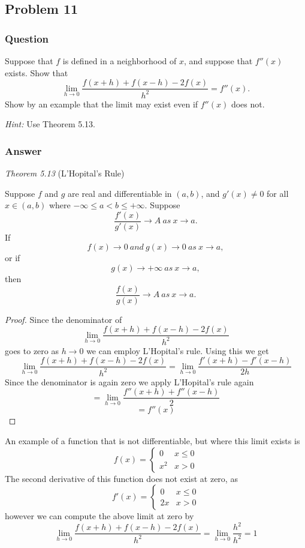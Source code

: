 \documentclass[12pt]{article}
\begin{document}
\subsection{Problem 11}

\subsubsection{Question}
Suppose that $f$ is defined in a neighborhood of $x$, and suppose that $f''(x)$ exists. Show that
\[\lim_{h \to 0}\frac{f(x+h)+f(x-h)-2 f(x)}{h^2} = f''(x).\]
Show by an example that the limit may exist even if $f''(x)$ does not.

\emph{Hint:} Use Theorem 5.13.

\subsubsection{Answer}

\emph{Theorem 5.13} (L'Hopital's Rule)

Suppose $f$ and $g$ are real and differentiable in $(a,b)$, and $g'(x) \neq 0$ for all $x\in (a,b)$ where $-\infty \leq a < b \leq + \infty$. Suppose
\[\frac{f'(x)}{g'(x)} \to A\ as\ x \to a.\]
If
\[f(x)\to 0\ and\ g(x)\to 0\ as\ x\to a,\]
or if
\[g(x)\to +\infty\ as\ x\to a,\]
then
\[\frac{f(x)}{g(x)}\to A\ as\ x\to a.\]

\begin{proof}
Since the denominator of 
\[\lim_{h \to 0}\frac{f(x+h)+f(x-h)-2 f(x)}{h^2}\]
goes to zero as $h \to 0$ we can employ L'Hopital's rule. Using this we get  
\[\lim_{h \to 0}\frac{f(x+h)+f(x-h)-2 f(x)}{h^2} = \lim_{h \to 0} \frac{f'(x+h)-f'(x-h)}{2 h}\]
Since the denominator is again zero we apply L'Hopital's rule again
\[ = \lim_{h \to 0} \frac{f''(x+h)+f''(x-h)}{2 }\]
\[ = f''(x) \]
\end{proof}

An example of a function that is not differentiable, but where this limit exists is 
\[ f(x)= \left\{ \begin{array}{lr} 0 & x \leq 0 \\ x^2  & x > 0 \end{array} \right. \]
The second derivative of this function does not exist at zero, as 
\[ f'(x)= \left\{ \begin{array}{lr} 0 & x \leq 0 \\ 2x  & x > 0 \end{array} \right. \]
however we can compute the above limit at zero by
\[\lim_{h \to 0}\frac{f(x+h)+f(x-h)-2 f(x)}{h^2}=\lim_{h \to 0}\frac{h^2}{h^2}=1\]
\end{document}
